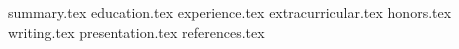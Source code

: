 \documentclass[11pt, a4paper]{awesome-cv}
\newcommand*{\sectiondir}{resume/}
\begin{document}
\makecvheader

{summary.tex}
{education.tex}
{experience.tex}
{extracurricular.tex}
{honors.tex}
{writing.tex}
{presentation.tex}
{references.tex}





\end{document}
